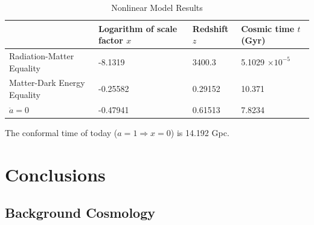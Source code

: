 \documentclass{aa}
\begin{document}
%
\begin{table}[ht]
\caption{Nonlinear Model Results}             
\label{table:1}      
\centering          
\begin{tabular}{l l l l}     %
\hline\hline       
& Logarithm of scale factor $x$      & Redshift $z$     & Cosmic time $t$ (Gyr)\\ 
\hline                    
Radiation-Matter Equality   & -8.1319  & 3400.3  & 5.1029 $\times 10^{-5}$ \\
Matter-Dark Energy Equality & -0.25582 & 0.29152 & 10.371                 \\
$\ddot a = 0$               & -0.47941 & 0.61513 & 7.8234\\ 
\hline                  
\end{tabular}
\end{table}

The conformal time of today ($a = 1 \Rightarrow x = 0$) is 14.192 Gpc.

\section{Conclusions}

\subsection{Background Cosmology}

\begin{acknowledgements}

\end{acknowledgements}

%
%



\end{document}
